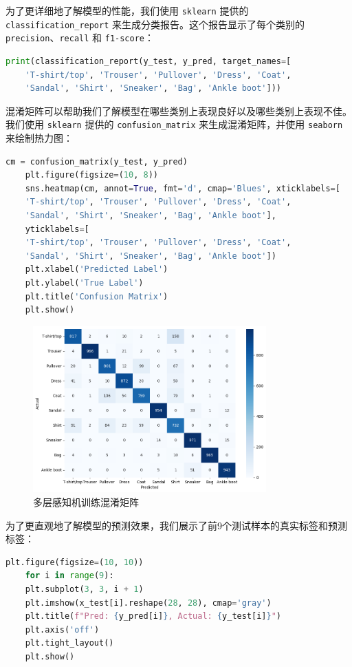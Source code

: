 \documentclass[a4paper,12pt]{article}
\begin{document}
为了更详细地了解模型的性能，我们使用 \texttt{sklearn} 提供的 \texttt{classification\_report} 来生成分类报告。这个报告显示了每个类别的 \texttt{precision}、\texttt{recall} 和 \texttt{f1-score}：

\begin{lstlisting}[language=Python]
	print(classification_report(y_test, y_pred, target_names=[
	'T-shirt/top', 'Trouser', 'Pullover', 'Dress', 'Coat',
	'Sandal', 'Shirt', 'Sneaker', 'Bag', 'Ankle boot']))
\end{lstlisting}


混淆矩阵可以帮助我们了解模型在哪些类别上表现良好以及哪些类别上表现不佳。我们使用 \texttt{sklearn} 提供的 \texttt{confusion\_matrix} 来生成混淆矩阵，并使用 \texttt{seaborn} 来绘制热力图：

\begin{lstlisting}[language=Python]
	cm = confusion_matrix(y_test, y_pred)
	plt.figure(figsize=(10, 8))
	sns.heatmap(cm, annot=True, fmt='d', cmap='Blues', xticklabels=[
	'T-shirt/top', 'Trouser', 'Pullover', 'Dress', 'Coat',
	'Sandal', 'Shirt', 'Sneaker', 'Bag', 'Ankle boot'],
	yticklabels=[
	'T-shirt/top', 'Trouser', 'Pullover', 'Dress', 'Coat',
	'Sandal', 'Shirt', 'Sneaker', 'Bag', 'Ankle boot'])
	plt.xlabel('Predicted Label')
	plt.ylabel('True Label')
	plt.title('Confusion Matrix')
	plt.show()
\end{lstlisting}
\begin{figure}[htbp]
	\centering
	\includegraphics[width=0.8\textwidth]{6.png}
	\caption{多层感知机训练混淆矩阵}
\end{figure}

为了更直观地了解模型的预测效果，我们展示了前9个测试样本的真实标签和预测标签：

\begin{lstlisting}[language=Python]
	plt.figure(figsize=(10, 10))
	for i in range(9):
	plt.subplot(3, 3, i + 1)
	plt.imshow(x_test[i].reshape(28, 28), cmap='gray')
	plt.title(f"Pred: {y_pred[i]}, Actual: {y_test[i]}")
	plt.axis('off')
	plt.tight_layout()
	plt.show()
\end{lstlisting}
\end{document}
